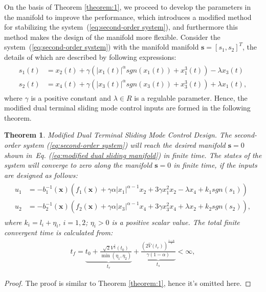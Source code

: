\documentclass[3p]{elsarticle}
\theoremstyle{plain}
\newtheorem{mythm}{Theorem}
\theoremstyle{remark}
\begin{document}
On the basis of Theorem \ref{theorem:1}, we proceed to develop the parameters in the manifold to improve the performance, which introduces a modified method for stabilizing the system~(\ref{eq:second-order system}), and furthermore this method makes the design of the manifold more flexible. Consider the system~(\ref{eq:second-order system}) with the manifold manifold $\bm s = [s_1,s_2]^T$, the details of which are described by following expressions:
\begin{align}
\begin{split}
s_1(t) &= x_2(t)+\gamma(\vert x_1(t)\vert^{\alpha} sgn(x_1(t))+x_1^3(t))-\lambda x_3(t)\\
s_2(t) &= x_4(t)+\gamma(\vert x_3(t)\vert^{\alpha} sgn(x_3(t))+x_3^3(t))+\lambda x_1(t),\label{eq:modified dual sliding manifold}
\end{split}
\end{align}
where $\gamma$ is a positive constant and $\lambda\in R$ is a regulable parameter. Hence, the modified dual terminal sliding mode control inputs are formed in the following theorem.
\begin{mythm}\label{theorem:2}Modified Dual Terminal Sliding Mode Control Design.
The second-order system (\ref{eq:second-order system}) will reach the desired manifold $\bm s = 0$ shown in~Eq. (\ref{eq:modified dual sliding manifold}) in finite time. The states of the system will converge to zero along the manifold $\bm s=0$ in finite time, if the inputs are designed as follows:
\begin{align}
\begin{split}
u_1 &= -b_1^{-1}(\bm x)(f_1(\bm x)+\gamma\alpha\vert x_1\vert^{\alpha-1}x_2+3\gamma x_1^2x_2-\lambda x_4+k_1sgn(s_1))\\
u_2 &= -b_2^{-1}(\bm x)(f_2(\bm x)+\gamma\alpha\vert x_3\vert^{\alpha-1}x_4+3\gamma x_3^2x_4+\lambda x_2+k_2sgn(s_2)),\label{eq:modified input}
\end{split}
\end{align}
where $k_i = l_i+\eta_i$, $i=1,2$; $\eta_i>0$ is a positive scalar value. The total finite convergent time is calculated from:
\begin{align}
t_f = \underbrace{t_0+\frac{\sqrt{2}V^{\frac{1}{2}}(t_0)}{\min(\eta_1,\eta_2)}}_{t_r}+\underbrace{\frac{(2\hat V(t_r))^{\frac{1-\alpha}{2}}}{\gamma(1-\alpha)}}_{t_s}<\infty,\label{eq:total convergent time}
\end{align}
\end{mythm}
\begin{proof}
The proof is similar to Theorem \ref{theorem:1}, hence it's omitted here.
\end{proof}
\end{document}
